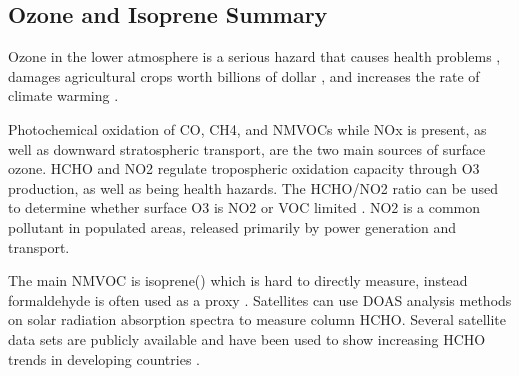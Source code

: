 \subsection{Ozone and Isoprene Summary}
Ozone in the lower atmosphere is a serious hazard that causes health problems \cite{Hsieh_2013}, damages agricultural crops worth billions of dollar \cite{Avnery_2011}, and increases the rate of climate warming \cite{IPCC_2013_chap8}.
  
Photochemical oxidation of CO, CH4, and NMVOCs while NOx is present, as well as downward stratospheric transport, are the two main sources of surface ozone.
HCHO and NO2 regulate tropospheric oxidation capacity through O3 production, as well as being health hazards.
The HCHO/NO2 ratio can be used to determine whether surface O3 is NO2 or VOC limited \cite{Mahajan_2015}.
NO2 is a common pollutant in populated areas, released primarily by power generation and transport.


The main NMVOC is isoprene(\cite{Guenther_2006}) which is hard to directly measure, instead formaldehyde is often used as a proxy \cite{Marais_2012, bauwens2013satellite}. 
Satellites can use DOAS analysis methods on solar radiation absorption spectra to measure column HCHO.
Several satellite data sets are publicly available and have been used to show increasing HCHO trends in developing countries \cite{Mahajan_2015}.
  
